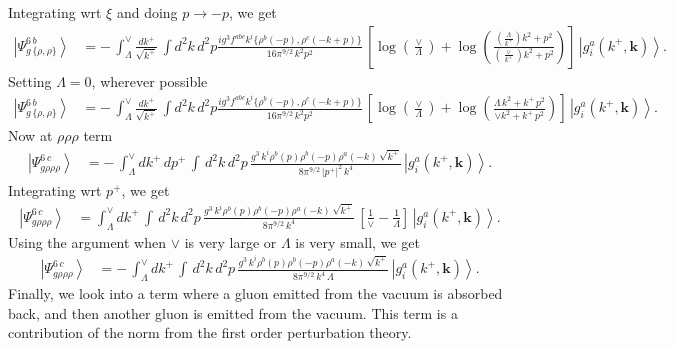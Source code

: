 \documentclass[aps,prd,amsmath,amssymb,nofootinbib]{revtex4-2}
\numberwithin{equation}{section}
\begin{document}
Integrating wrt $\xi$ and doing $p\rightarrow -p$, we get
\begin{align}
    \left|\Psi_{g\,\{\rho,\rho\}}^{6\, b}\right\rangle & =-\,\int_{\Lambda}^{\vee} \frac{dk^{+}}{\sqrt{k^{+}}}\, \int d^{2}k \, d^{2}p \frac{ig^{3}f^{abc}k^{i}\{\rho^{b}(-p),\rho^{c}(-k+p)\}}{16\pi^{9/2}\,k^{2}p^{2}}\,\left[\log{\left(\frac{\vee}{\Lambda}\right)}+\log{\left(\frac{\left(\frac{\Lambda}{k^{+}}\right) k^{2}+p^{2}}{\left(\frac{\vee}{k^{+}} \right)k^{2}+p^{2}}\right)}\right]\,\left|g_{i}^{a}(k^{+},\mathbf{k})\right\rangle.
\end{align}
Setting $\Lambda = 0$, wherever possible 
\begin{align}\label{tworhoafter}
    \left|\Psi_{g\,\{\rho,\rho\}}^{6\, b}\right\rangle & =-\,\int_{\Lambda}^{\vee} \frac{dk^{+}}{\sqrt{k^{+}}}\, \int d^{2}k \, d^{2}p \frac{ig^{3}f^{abc}k^{i}\{\rho^{b}(-p),\rho^{c}(-k+p)\}}{16\pi^{9/2}\,k^{2}p^{2}}\,\left[\log{\left(\frac{\vee}{\Lambda}\right)}+\log{\left(\frac{\Lambda\, k^{2} + k^{+}\,p^{2}}{\vee k^{2}+k^{+}\,p^{2}}\right)}\right]\,\left|g_{i}^{a}(k^{+},\mathbf{k})\right\rangle.
\end{align}
Now at $\rho\rho\rho$ term
\begin{align}
    \left|\Psi_{g\rho\rho\rho}^{6\, c}\right\rangle & = -\, \int_{\Lambda}^{\vee} dk^{+}\, dp^{+}\, \int\, d^{2}k\, d^{2}p\, \frac{g^{3}\, k^{i}\rho^{b}(p)\rho^{b}(-p)\rho^{a}(-k)\,\sqrt{k^{+}}}{8\pi^{9/2}\,|p^{+}|^{2}\,k^{4}}\,\left|g_{i}^{a}(k^{+},\mathbf{k})\right\rangle. 
\end{align}
Integrating wrt $p^{+}$, we get
\begin{align}
    \left|\Psi_{g\rho\rho\rho}^{6\, c}\right\rangle & = \int_{\Lambda}^{\vee} dk^{+}\, \int\, d^{2}k\, d^{2}p\, \frac{g^{3}\, k^{i}\rho^{b}(p)\rho^{b}(-p)\rho^{a}(-k)\,\sqrt{k^{+}}}{8\pi^{9/2}\,k^{4}}\, \left[\frac{1}{\vee}-\frac{1}{\Lambda}\right]\,\left|g_{i}^{a}(k^{+},\mathbf{k})\right\rangle.
\end{align}
Using the argument when $\vee$ is very large or $\Lambda$ is very small, we get
\begin{align}\label{threerhoafter}
        \left|\Psi_{g\rho\rho\rho}^{6\, c}\right\rangle & = -\,\int_{\Lambda}^{\vee} dk^{+}\, \int\, d^{2}k\, d^{2}p\, \frac{g^{3}\, k^{i}\rho^{b}(p)\rho^{b}(-p)\rho^{a}(-k)\,\sqrt{k^{+}}}{8\pi^{9/2}\,k^{4}\, \Lambda}\,\left|g_{i}^{a}(k^{+},\mathbf{k})\right\rangle.
\end{align}
Finally, we look into a term where a gluon emitted from the vacuum is absorbed back, and then another gluon is emitted from the vacuum. This term is a contribution of the norm from the first order perturbation theory.
\end{document}
